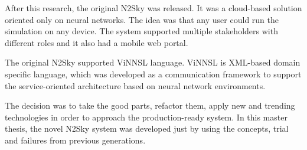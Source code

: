 After this research, the original N2Sky \cite{N2Sky} was released. It was a cloud-based solution oriented only on neural networks. The idea was that any user could run the simulation on any device. The system supported multiple stakeholders with different roles and it also had a mobile web portal. 

The original N2Sky supported ViNNSL language. ViNNSL is XML-based domain specific language, which was developed as a communication framework to support the service-oriented architecture based on neural network environments. 

The decision was to take the good parts, refactor them, apply new and trending technologies in order to approach the production-ready system. In this master thesis, the novel N2Sky system was developed just by using the concepts, trial and failures from previous generations. 

